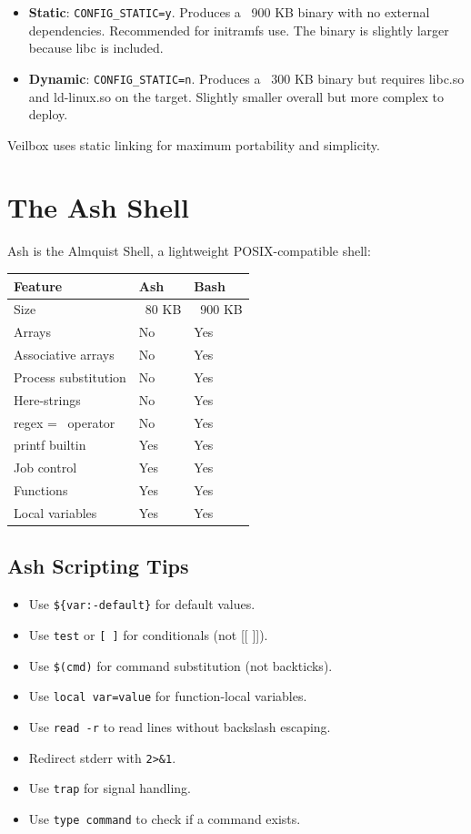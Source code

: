 \begin{itemize}[nosep]
  \item \textbf{Static}: \texttt{CONFIG\_STATIC=y}. Produces a ~900 KB
        binary with no external dependencies. Recommended for initramfs
        use. The binary is slightly larger because libc is included.
  \item \textbf{Dynamic}: \texttt{CONFIG\_STATIC=n}. Produces a ~300 KB
        binary but requires libc.so and ld-linux.so on the target.
        Slightly smaller overall but more complex to deploy.
\end{itemize}

Veilbox uses static linking for maximum portability and simplicity.

\section{The Ash Shell}

Ash is the Almquist Shell, a lightweight POSIX-compatible shell:

\begin{longtable}{|p{3cm}|p{4cm}|p{5cm}|}
\hline
\textbf{Feature} & \textbf{Ash} & \textbf{Bash} \\
\hline
Size & ~80 KB & ~900 KB \\
Arrays & No & Yes \\
Associative arrays & No & Yes \\
Process substitution & No & Yes \\
Here-strings & No & Yes \\
regex =~ operator & No & Yes \\
printf builtin & Yes & Yes \\
Job control & Yes & Yes \\
Functions & Yes & Yes \\
Local variables & Yes & Yes \\
\hline
\end{longtable}

\subsection{Ash Scripting Tips}

\begin{itemize}[nosep]
  \item Use \texttt{\$\{var:-default\}} for default values.
  \item Use \texttt{test} or \texttt{[ ]} for conditionals (not [[ ]]).
  \item Use \texttt{\$(cmd)} for command substitution (not backticks).
  \item Use \texttt{local var=value} for function-local variables.
  \item Use \texttt{read -r} to read lines without backslash escaping.
  \item Redirect stderr with \texttt{2>\&1}.
  \item Use \texttt{trap} for signal handling.
  \item Use \texttt{type command} to check if a command exists.
\end{itemize}
